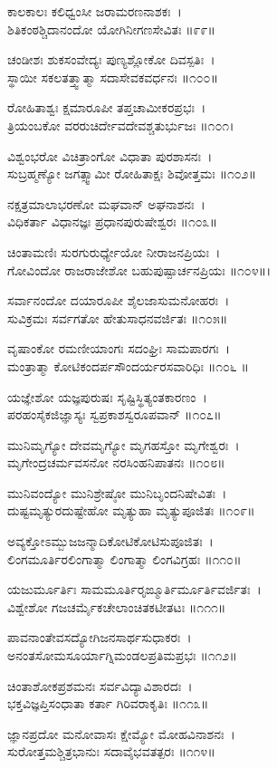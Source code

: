 	ಕಾಲಕಾಲಃ ಕಲಿಧ್ವಂಸೀ ಜರಾಮರಣನಾಶಕಃ~।\\
	ಶಿತಿಕಂಠಶ್ಚಿದಾನಂದೋ ಯೋಗಿನೀಗಣಸೇವಿತಃ ॥೯೯॥

ಚಂಡೀಶಃ ಶುಕಸಂವೇದ್ಯಃ ಪುಣ್ಯಶ್ಲೋಕೋ ದಿವಸ್ಪತಿಃ~।\\
ಸ್ಥಾಯೀ ಸಕಲತತ್ತ್ವಾತ್ಮಾ ಸದಾಸೇವಕವರ್ಧನಃ ॥೧೦೦॥

	ರೋಹಿತಾಶ್ವಃ ಕ್ಷಮಾರೂಪೀ ತಪ್ತಚಾಮೀಕರಪ್ರಭಃ~।\\
	ತ್ರಿಯಂಬಕೋ ವರರುಚಿರ್ದೇವದೇವಶ್ಚತುರ್ಭುಜಃ ॥೧೦೧।

ವಿಶ್ವಂಭರೋ ವಿಚಿತ್ರಾಂಗೋ ವಿಧಾತಾ ಪುರಶಾಸನಃ~।\\
ಸುಬ್ರಹ್ಮಣ್ಯೋ ಜಗತ್ಸ್ವಾಮೀ ರೋಹಿತಾಕ್ಷಃ ಶಿವೋತ್ತಮಃ ॥೧೦೨॥

	ನಕ್ಷತ್ರಮಾಲಾಭರಣೋ ಮಘವಾನ್ ಅಘನಾಶನಃ~।\\
	ವಿಧಿಕರ್ತಾ ವಿಧಾನಜ್ಞಃ ಪ್ರಧಾನಪುರುಷೇಶ್ವರಃ ॥೧೦೩॥

ಚಿಂತಾಮಣಿಃ ಸುರಗುರುರ್ಧ್ಯೇಯೋ ನೀರಾಜನಪ್ರಿಯಃ~।\\
ಗೋವಿಂದೋ ರಾಜರಾಜೇಶೋ ಬಹುಪುಷ್ಪಾರ್ಚನಪ್ರಿಯಃ ॥೧೦೪॥।

ಸರ್ವಾನಂದೋ ದಯಾರೂಪೀ ಶೈಲಜಾಸುಮನೋಹರಃ~।\\
ಸುವಿಕ್ರಮಃ ಸರ್ವಗತೋ ಹೇತುಸಾಧನವರ್ಜಿತಃ ॥೧೦೫॥

	ವೃಷಾಂಕೋ ರಮಣೀಯಾಂಗಃ ಸದಂಘ್ರಿಃ ಸಾಮಪಾರಗಃ~।\\
	ಮಂತ್ರಾತ್ಮಾ ಕೋಟಿಕಂದರ್ಪಸೌಂದರ್ಯರಸವಾರಿಧಿಃ ॥೧೦೬ ॥

ಯಜ್ಞೇಶೋ ಯಜ್ಞಪುರುಷಃ ಸೃಷ್ಟಿಸ್ಥಿತ್ಯಂತಕಾರಣಂ~।\\
ಪರಹಂಸೈಕಜಿಜ್ಞಾಸ್ಯಃ ಸ್ವಪ್ರಕಾಶಸ್ವರೂಪವಾನ್ ॥೧೦೭॥

	ಮುನಿಮೃಗ್ಯೋ ದೇವಮೃಗ್ಯೋ ಮೃಗಹಸ್ತೋ ಮೃಗೇಶ್ವರಃ~।\\
	ಮೃಗೇಂದ್ರಚರ್ಮವಸನೋ ನರಸಿಂಹನಿಪಾತನಃ ॥೧೦೮॥

ಮುನಿವಂದ್ಯೋ ಮುನಿಶ್ರೇಷ್ಠೋ ಮುನಿಬೃಂದನಿಷೇವಿತಃ~।\\
ದುಷ್ಟಮೃತ್ಯುರದುಷ್ಟೇಹೋ ಮೃತ್ಯುಹಾ ಮೃತ್ಯುಪೂಜಿತಃ ॥೧೦೯॥

	ಅವ್ಯಕ್ತೋಽಮ್ಬುಜಜನ್ಮಾದಿಕೋಟಿಕೋಟಿಸುಪೂಜಿತಃ~।\\
	ಲಿಂಗಮೂರ್ತಿರಲಿಂಗಾತ್ಮಾ ಲಿಂಗಾತ್ಮಾ ಲಿಂಗವಿಗ್ರಹಃ ॥೧೧೦॥

ಯಜುರ್ಮೂರ್ತಿಃ ಸಾಮಮೂರ್ತಿರೃಙ್ಮೂರ್ತಿರ್ಮೂರ್ತಿವರ್ಜಿತಃ~।\\
ವಿಶ್ವೇಶೋ ಗಜಚರ್ಮೈಕಚೇಲಾಂಚಿತಕಟೀತಟಃ ॥೧೧೧॥

	ಪಾವನಾಂತೇವಸದ್ಯೋಗಿಜನಸಾರ್ಥಸುಧಾಕರಃ~।\\
	ಅನಂತಸೋಮಸೂರ್ಯಾಗ್ನಿಮಂಡಲಪ್ರತಿಮಪ್ರಭಃ ॥೧೧೨॥

ಚಿಂತಾಶೋಕಪ್ರಶಮನಃ ಸರ್ವವಿದ್ಯಾವಿಶಾರದಃ~।\\
ಭಕ್ತವಿಜ್ಞಪ್ತಿಸಂಧಾತಾ ಕರ್ತಾ ಗಿರಿವರಾಕೃತಿಃ ॥೧೧೩॥

	ಜ್ಞಾನಪ್ರದೋ ಮನೋವಾಸಃ ಕ್ಷೇಮ್ಯೋ ಮೋಹವಿನಾಶನಃ~।\\
	ಸುರೋತ್ತಮಶ್ಚಿತ್ರಭಾನುಃ ಸದಾವೈಭವತತ್ಪರಃ ॥೧೧೪॥

